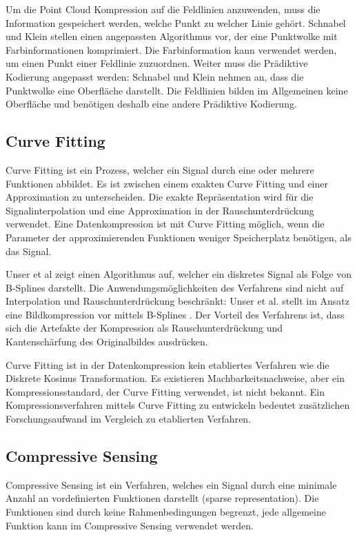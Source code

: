 Um die Point Cloud Kompression auf die Feldlinien anzuwenden, muss die Information gespeichert werden, welche Punkt zu welcher Linie gehört. Schnabel und Klein stellen einen angepassten Algorithmus vor, der eine Punktwolke mit Farbinformationen komprimiert. Die Farbinformation kann verwendet werden, um einen Punkt einer Feldlinie zuzuordnen. Weiter muss die Prädiktive Kodierung angepasst werden: Schnabel und Klein nehmen an, dass die Punktwolke eine Oberfläche darstellt. Die Feldlinien bilden im Allgemeinen keine Oberfläche und benötigen deshalb eine andere Prädiktive Kodierung.

\subsection{Curve Fitting}
Curve Fitting ist ein Prozess, welcher ein Signal durch eine oder mehrere Funktionen abbildet. Es ist zwischen einem exakten Curve Fitting und einer Approximation zu unterscheiden. Die exakte Repräsentation wird für die Signalinterpolation und eine Approximation in der Rauschunterdrückung verwendet. Eine Datenkompression ist mit Curve Fitting möglich, wenn die Parameter der approximierenden Funktionen weniger Speicherplatz benötigen, als das Signal.

Unser et al \cite{unser1993b:spline} zeigt einen Algorithmus auf, welcher ein diskretes Signal als Folge von B-Splines darstellt. Die Anwendungsmöglichkeiten des Verfahrens sind nicht auf Interpolation und Rauschunterdrückung beschränkt: Unser et al. stellt im Ansatz eine Bildkompression vor mittels B-Splines \cite{unser1993b2:spline}. Der Vorteil des Verfahrens ist, dass sich die Artefakte der Kompression als Rauschunterdrückung und Kantenschärfung des Originalbildes ausdrücken.

Curve Fitting ist in der Datenkompression kein etabliertes Verfahren wie die Diskrete Kosinus Transformation. Es existieren Machbarkeitsnachweise, aber ein Kompressionsstandard, der Curve Fitting verwendet, ist nicht bekannt. Ein Kompressionsverfahren mittels Curve Fitting zu entwickeln bedeutet zusätzlichen Forschungsaufwand im Vergleich zu etablierten Verfahren.

\subsection{Compressive Sensing}
Compressive Sensing ist ein Verfahren, welches ein Signal durch eine minimale Anzahl an vordefinierten Funktionen darstellt (sparse representation). Die Funktionen sind durch keine Rahmenbedingungen begrenzt, jede allgemeine Funktion kann im Compressive Sensing verwendet werden.


